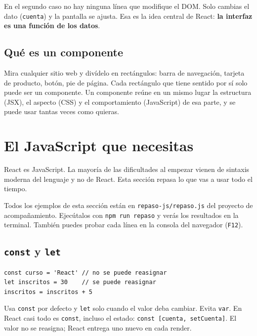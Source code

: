 \documentclass[11pt,a4paper]{article}
\newcommand{\cmd}[1]{\texttt{\color{reactdark}#1}}
\begin{document}
En el segundo caso no hay ninguna línea que modifique el DOM. Solo cambias el dato (\cmd{cuenta}) y la pantalla se ajusta. Esa es la idea central de React: \textbf{la interfaz es una función de los datos}.

\subsection{Qué es un componente}

Mira cualquier sitio web y divídelo en rectángulos: barra de navegación, tarjeta de producto, botón, pie de página. Cada rectángulo que tiene sentido por sí solo puede ser un componente. Un componente reúne en un mismo lugar la estructura (JSX), el aspecto (CSS) y el comportamiento (JavaScript) de esa parte, y se puede usar tantas veces como quieras.

\section{El JavaScript que necesitas}\label{sec:js}

React es JavaScript. La mayoría de las dificultades al empezar vienen de sintaxis moderna del lenguaje y no de React. Esta sección repasa lo que vas a usar todo el tiempo.

\begin{nota}
Todos los ejemplos de esta sección están en \cmd{repaso-js/repaso.js} del proyecto de acompañamiento. Ejecútalos con \cmd{npm run repaso} y verás los resultados en la terminal. También puedes probar cada línea en la consola del navegador (\cmd{F12}).
\end{nota}

\subsection{\texttt{const} y \texttt{let}}

\begin{lstlisting}[language=JSX]
const curso = 'React' // no se puede reasignar
let inscritos = 30    // se puede reasignar
inscritos = inscritos + 5
\end{lstlisting}

Usa \cmd{const} por defecto y \cmd{let} solo cuando el valor deba cambiar. Evita \cmd{var}. En React casi todo es \cmd{const}, incluso el estado: \cmd{const [cuenta, setCuenta]}. El valor no se reasigna; React entrega uno nuevo en cada render.
\end{document}

